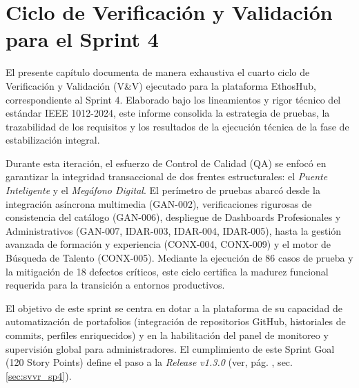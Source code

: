 
\chapter{Ciclo de Verificación y Validación para el Sprint 4}
\label{ch:sprint4}

El presente capítulo documenta de manera exhaustiva el cuarto ciclo de Verificación y Validación (V\&V) ejecutado para la plataforma EthosHub, correspondiente al Sprint 4. Elaborado bajo los lineamientos y rigor técnico del estándar IEEE 1012-2024, este informe consolida la estrategia de pruebas, la trazabilidad de los requisitos y los resultados de la ejecución técnica de la fase de estabilización integral. \par

Durante esta iteración, el esfuerzo de Control de Calidad (QA) se enfocó en garantizar la integridad transaccional de dos frentes estructurales: el \textit{Puente Inteligente} y el \textit{Megáfono Digital}. El perímetro de pruebas abarcó desde la integración asíncrona multimedia (GAN-002), verificaciones rigurosas de consistencia del catálogo (GAN-006), despliegue de Dashboards Profesionales y Administrativos (GAN-007, IDAR-003, IDAR-004, IDAR-005), hasta la gestión avanzada de formación y experiencia (CONX-004, CONX-009) y el motor de Búsqueda de Talento (CONX-005). Mediante la ejecución de 86 casos de prueba y la mitigación de 18 defectos críticos, este ciclo certifica la madurez funcional requerida para la transición a entornos productivos.

\newpage
\begin{NotaTecnica}
El objetivo de este sprint se centra en dotar a la plataforma de su capacidad de automatización de portafolios (integración de repositorios GitHub, historiales de commits, perfiles enriquecidos) y en la habilitación del panel de monitoreo y supervisión global para administradores. El cumplimiento de este Sprint Goal (120 Story Points) define el paso a la \textit{Release v1.3.0} (ver, pág. \pageref{sec:svvr_sp4}, sec. \ref{sec:svvr_sp4}).
\end{NotaTecnica}

